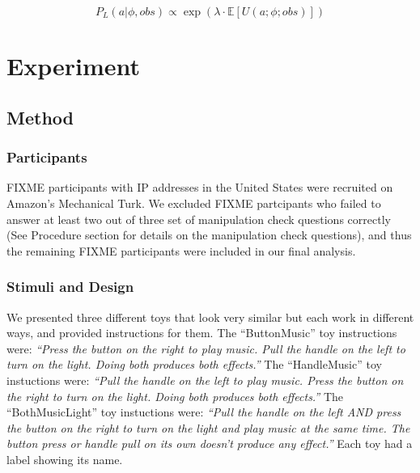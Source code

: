 \documentclass[10pt, letterpaper]{article}
\begin{document}
\[ P_L(a | \phi, obs) \propto \exp(\lambda \cdot \mathbb{E}[U(a;\phi; obs)])\]

\section{Experiment}\label{experiment}

\subsection{Method}\label{method}

\subsubsection{Participants}\label{participants}

FIXME participants with IP addresses in the United States were recruited
on Amazon's Mechanical Turk. We excluded FIXME partcipants who failed to
answer at least two out of three set of manipulation check questions
correctly (See Procedure section for details on the manipulation check
questions), and thus the remaining FIXME participants were included in
our final analysis.

\subsubsection{Stimuli and Design}\label{stimuli-and-design}

We presented three different toys that look very similar but each work
in different ways, and provided instructions for them. The
``ButtonMusic'' toy instructions were: \emph{``Press the button on the
right to play music. Pull the handle on the left to turn on the light.
Doing both produces both effects.''} The ``HandleMusic'' toy instuctions
were: \emph{``Pull the handle on the left to play music. Press the
button on the right to turn on the light. Doing both produces both
effects.''} The ``BothMusicLight'' toy instuctions were: \emph{``Pull
the handle on the left AND press the button on the right to turn on the
light and play music at the same time. The button press or handle pull
on its own doesn't produce any effect.''} Each toy had a label showing
its name.
\end{document}
